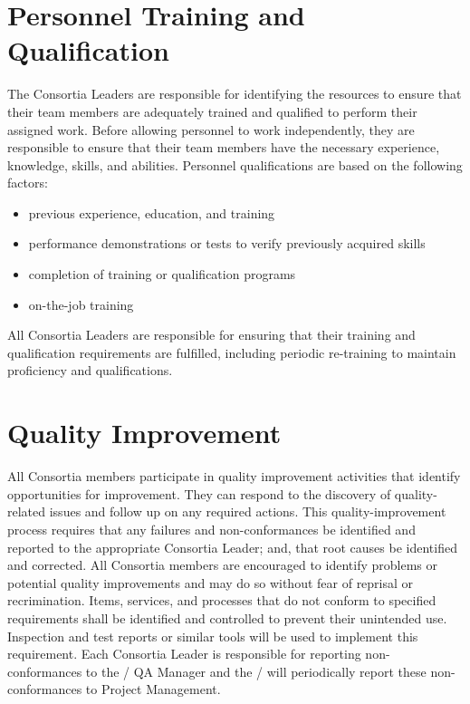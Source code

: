 \section{Personnel Training and Qualification}

The  Consortia Leaders are responsible for identifying the
resources to ensure that their team members are adequately trained and
qualified to perform their assigned work. Before allowing personnel to
work independently, they are responsible to ensure that their team
members have the necessary experience, knowledge, skills, and
abilities. Personnel qualifications are based on the following
factors:
\begin{itemize}
 \item previous experience, education, and training
 \item performance demonstrations or tests to verify previously acquired skills
 \item completion of training or qualification programs
 \item on-the-job training
\end{itemize}

All  Consortia Leaders are responsible for ensuring that their
training and qualification requirements are fulfilled, including
periodic re-training to maintain proficiency and qualifications.


\section{Quality Improvement}

All  Consortia members participate in quality improvement
activities that identify opportunities for improvement. They can
respond to the discovery of quality-related issues and follow up on
any required actions. This quality-improvement process requires that
any failures and non-conformances be identified and reported to the
appropriate Consortia Leader; and, that root causes be identified and
corrected. All Consortia members are encouraged to identify problems
or potential quality improvements and may do so without fear of
reprisal or recrimination. Items, services, and processes that do not
conform to specified requirements shall be identified and controlled
to prevent their unintended use. Inspection and test reports or
similar tools will be used to implement this requirement. Each
Consortia Leader is responsible for reporting non-conformances to the
/ QA Manager and the /  will periodically
report these non-conformances to  Project Management.

